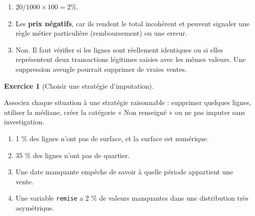\documentclass[
  french,
  letterpaper,
  open=any]{scrbook}
\providecommand{\tightlist}{%
  \setlength{\itemsep}{0pt}\setlength{\parskip}{0pt}}
\theoremstyle{definition}
\theoremstyle{definition}
\newtheorem{exercise}{Exercice}[section]
\theoremstyle{remark}
\begin{document}
\begin{tcolorbox}[enhanced jigsaw, arc=.35mm, bottomrule=.15mm, bottomtitle=1mm, breakable, colback=white, colbacktitle=quarto-callout-tip-color!10!white, colframe=quarto-callout-tip-color-frame, coltitle=black, left=2mm, leftrule=.75mm, opacityback=0, opacitybacktitle=0.6, rightrule=.15mm, title=\textcolor{quarto-callout-tip-color}{\faLightbulb}\hspace{0.5em}{Solution de l'exercice Exercice~\ref{exr-prep-4}}, titlerule=0mm, toprule=.15mm, toptitle=1mm]

\begin{enumerate}
\def\labelenumi{\alph{enumi}.}
\tightlist
\item
  \(20/1000 \times 100 = 2\%\).
\item
  Les \textbf{prix négatifs}, car ils rendent le total incohérent et
  peuvent signaler une règle métier particulière (remboursement) ou une
  erreur.
\item
  Non. Il faut vérifier si les lignes sont réellement identiques ou si
  elles représentent deux transactions légitimes saisies avec les mêmes
  valeurs. Une suppression aveugle pourrait supprimer de vraies ventes.
\end{enumerate}

\end{tcolorbox}

\begin{exercise}[Choisir une stratégie
d'imputation]\protect\hypertarget{exr-prep-5}{}\label{exr-prep-5}

Associez chaque situation à une stratégie raisonnable : supprimer
quelques lignes, utiliser la médiane, créer la catégorie « Non renseigné
» ou ne pas imputer sans investigation.

\begin{enumerate}
\def\labelenumi{\alph{enumi}.}
\tightlist
\item
  1 \% des lignes n'ont pas de surface, et la surface est numérique.
\item
  35 \% des lignes n'ont pas de quartier.
\item
  Une date manquante empêche de savoir à quelle période appartient une
  vente.
\item
  Une variable \texttt{remise} a 2 \% de valeurs manquantes dans une
  distribution très asymétrique.
\end{enumerate}

\end{exercise}
\end{document}
